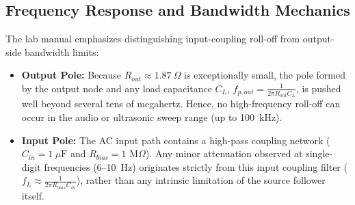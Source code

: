 \documentclass[11pt, a4paper]{article}
\begin{document}
\subsection{Frequency Response and Bandwidth Mechanics}
The lab manual emphasizes distinguishing input-coupling roll-off from output-side bandwidth limits:
\begin{itemize}
    \item \textbf{Output Pole:} Because $R_{out} \approx 1.87\ \Omega$ is exceptionally small, the pole formed by the output node and any load capacitance $C_L$, $f_{p,out} = \frac{1}{2\pi R_{out} C_L}$, is pushed well beyond several tens of megahertz. Hence, no high-frequency roll-off can occur in the audio or ultrasonic sweep range (up to 100~kHz).
    \item \textbf{Input Pole:} The AC input path contains a high-pass coupling network ($C_{in} = 1\ \mu\text{F}$ and $R_{bias} = 1\text{ M}\Omega$). Any minor attenuation observed at single-digit frequencies (6--10~Hz) originates strictly from this input coupling filter ($f_L \approx \frac{1}{2\pi R_{bias} C_{in}}$), rather than any intrinsic limitation of the source follower itself.
\end{itemize}
\end{document}
